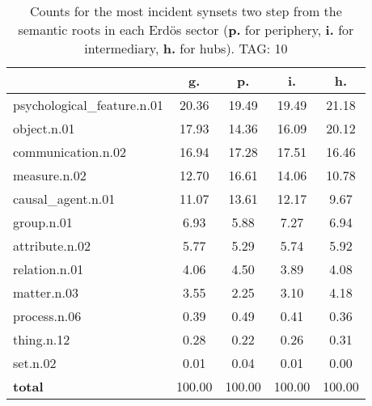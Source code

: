 \begin{table}[h!]
\begin{center}
\begin{tabular}{| l | c | c | c | c |}\hline
 & g. & p. & i. & h. \\\hline
psychological\_feature.n.01 & 20.36  & 19.49  & 19.49  & 21.18 \\\hline
object.n.01 & 17.93  & 14.36  & 16.09  & 20.12 \\\hline
communication.n.02 & 16.94  & 17.28  & 17.51  & 16.46 \\\hline
measure.n.02 & 12.70  & 16.61  & 14.06  & 10.78 \\\hline
causal\_agent.n.01 & 11.07  & 13.61  & 12.17  & 9.67 \\\hline
group.n.01 & 6.93  & 5.88  & 7.27  & 6.94 \\\hline
attribute.n.02 & 5.77  & 5.29  & 5.74  & 5.92 \\\hline
relation.n.01 & 4.06  & 4.50  & 3.89  & 4.08 \\\hline
matter.n.03 & 3.55  & 2.25  & 3.10  & 4.18 \\\hline
process.n.06 & 0.39  & 0.49  & 0.41  & 0.36 \\\hline
thing.n.12 & 0.28  & 0.22  & 0.26  & 0.31 \\\hline
set.n.02 & 0.01  & 0.04  & 0.01  & 0.00 \\\hline
{{\bf total}} & 100.00  & 100.00  & 100.00  & 100.00 \\\hline
\end{tabular}
\caption{Counts for the most incident synsets two step from the semantic roots in each Erd\"os sector ({\bf p.} for periphery, {\bf i.} for intermediary, {\bf h.} for hubs). TAG: 10}
\end{center}
\end{table}
